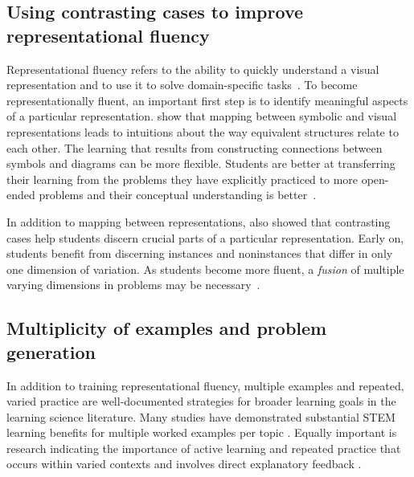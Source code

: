 \subsection{Using contrasting cases to improve representational fluency}

Representational fluency refers to the ability to quickly understand a visual representation and to use it to solve domain-specific tasks~\cite{multipleReps}. To become representationally fluent, an important first step is to identify meaningful aspects of a particular representation. \citet{perceptualLearning} show that mapping between symbolic and visual representations leads to intuitions about the way equivalent structures relate to each other. The learning that results from constructing connections between symbols and diagrams can be more flexible. Students are better at transferring their learning from the problems they have explicitly practiced to more open-ended problems and their conceptual understanding is better~\cite{25learning}. 

In addition to mapping between representations, \citet{samenessAndDifference} also showed that contrasting cases help students discern crucial parts of a particular representation. Early on, students benefit from discerning instances and noninstances that differ in only one dimension of variation. As students become more fluent, a \emph{fusion} of multiple varying dimensions in problems may be necessary~\cite{fusion}.

\subsection{Multiplicity of examples and problem generation}

In addition to training representational fluency, multiple examples and repeated, varied practice are well-documented strategies for broader learning goals in the learning science literature. Many studies have demonstrated substantial STEM learning benefits for multiple worked examples per topic \cite{PBB07}. Equally important is research indicating the importance of active learning \cite{CW14, DMM19} and repeated practice \cite{deliberatePractice, SSL98} that occurs within varied contexts \cite{PV94, RT07} and involves direct explanatory feedback \cite{perceptualLearning}.

